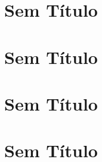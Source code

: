\documentclass[]{book}
\begin{document}
\chapter{Sem Título}\label{sem-titulo}

\chapter{Sem Título}\label{sem-titulo-1}

\chapter{Sem Título}\label{sem-titulo-2}

\chapter{Sem Título}\label{sem-titulo-3}


\end{document}
